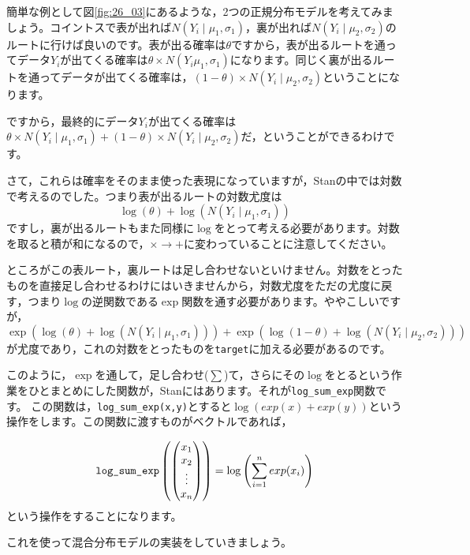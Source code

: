 \documentclass{ltjsbook}
\begin{document}
簡単な例として図\ref{fig:26_03}にあるような，2つの正規分布モデルを考えてみましょう。コイントスで表が出れば$N(Y_i \mid \mu_1,\sigma_1)$，裏が出れば$N(Y_i \mid \mu_2,\sigma_2)$のルートに行けば良いのです。表が出る確率は$\theta$ですから，表が出るルートを通ってデータ$Y_i$が出てくる確率は$\theta \times N(Y_i\mu_1,\sigma_1)$になります。同じく裏が出るルートを通ってデータが出てくる確率は，$(1-\theta) \times N(Y_i \mid \mu_2,\sigma_2)$ということになります。

ですから，最終的にデータ$Y_i$が出てくる確率は$\theta \times N(Y_i \mid \mu_1,\sigma_1) + (1-\theta) \times N(Y_i\mid\mu_2,\sigma_2)$だ，ということができるわけです。

さて，これらは確率をそのまま使った表現になっていますが，Stanの中では対数で考えるのでした。つまり表が出るルートの対数尤度は
\[ \log(\theta) + \log(N(Y_i\mid\mu_1,\sigma_1)) \]
ですし，裏が出るルートもまた同様に$\log$をとって考える必要があります。対数を取ると積が和になるので，$\times \to +$に変わっていることに注意してください。

ところがこの表ルート，裏ルートは足し合わせないといけません。対数をとったものを直接足し合わせるわけにはいきませんから，対数尤度をただの尤度に戻す，つまり$\log$の逆関数である$\exp$関数を通す必要があります。ややこしいですが，
\[ \exp\left( \log(\theta) + \log(N(Y_i\mid\mu_1,\sigma_1)) \right) + \exp\left( \log(1-\theta) + \log(N(Y_i\mid\mu_2,\sigma_2)) \right) \]
が尤度であり，これの対数をとったものを\verb|target|に加える必要があるのです。

このように，$\exp$を通して，足し合わせ($\sum$)て，さらにその$\log$をとるという作業をひとまとめにした関数が，Stanにはあります。それが\verb|log_sum_exp|関数です。
この関数は，\verb|log_sum_exp(x,y)|とすると$\log(exp(x)+exp(y))$という操作をします。この関数に渡すものがベクトルであれば，

\[ \verb|log_sum_exp|\left( \begin{pmatrix} x_1\\x_2\\ \vdots \\ x_n \end{pmatrix} \right) = \log\left(\sum_{i=1}^n exp(x_i) \right) \]
という操作をすることになります。

これを使って混合分布モデルの実装をしていきましょう。
\end{document}
